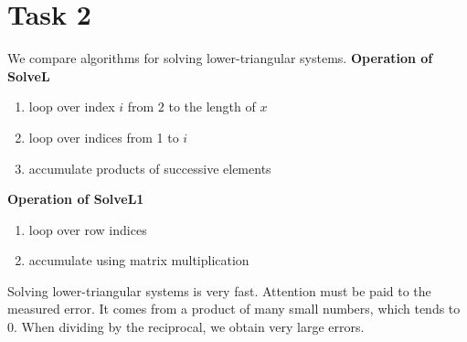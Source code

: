 \section{Task 2}
We compare algorithms for solving lower-triangular systems.
\textbf{Operation of SolveL}
\begin{enumerate}
    \item loop over index $i$ from $2$ to the length of $x$
    \item loop over indices from 1 to $i$
    \item accumulate products of successive elements
\end{enumerate}
\textbf{Operation of SolveL1}
\begin{enumerate}
    \item loop over row indices
    \item accumulate using matrix multiplication
\end{enumerate}


\begin{center}
\end{center}


\noindent
Solving lower-triangular systems is very fast. Attention must be paid to the measured error. It comes from a product of many small numbers, which tends to $0$. When dividing by the reciprocal, we obtain very large errors.
